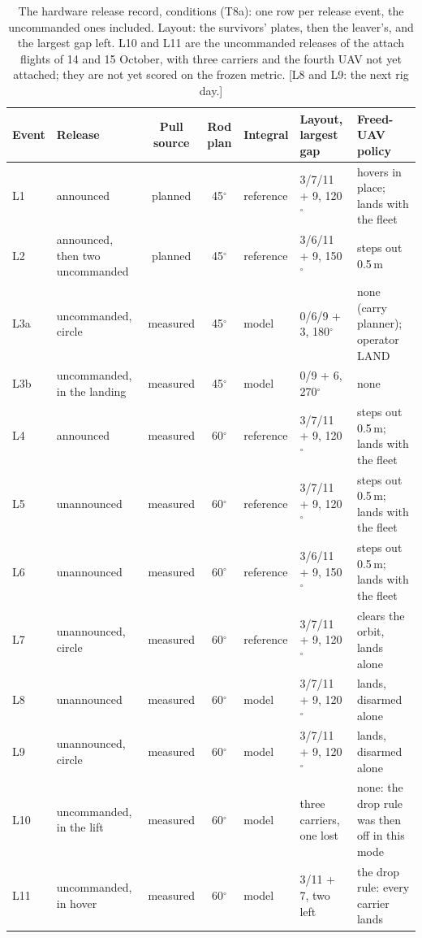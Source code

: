 \begin{table}[htbp]
  \centering
  \footnotesize
  \caption[The rig release record: conditions]{The hardware release record, conditions (T8a): one row per release
  event, the uncommanded ones included. Layout: the survivors' plates, then the leaver's, and the largest gap left.
  L10 and L11 are the uncommanded releases of the attach flights of 14 and 15 October, with three carriers and the
  fourth UAV not yet attached; they are not yet scored on the frozen metric. [L8 and L9: the next rig day.]}
  \label{tab:T8a}
  \begin{tabularx}{\textwidth}{lYccYYY}
    \toprule
    Event & Release & Pull source & Rod plan & Integral & Layout, largest gap & Freed-UAV policy \\
    \midrule
    L1 & announced & planned & 45$^\circ$ & reference & 3/7/11 + 9, 120$^\circ$ & hovers in place; lands with the fleet \\ %
    L2 & announced, then two uncommanded & planned & 45$^\circ$ & reference & 3/6/11 + 9, 150$^\circ$ & steps out 0.5\,m \\ %
    L3a & uncommanded, circle & measured & 45$^\circ$ & model & 0/6/9 + 3, 180$^\circ$ & none (carry planner); operator LAND \\ %
    L3b & uncommanded, in the landing & measured & 45$^\circ$ & model & 0/9 + 6, 270$^\circ$ & none \\ %
    L4 & announced & measured & 60$^\circ$ & reference & 3/7/11 + 9, 120$^\circ$ & steps out 0.5\,m; lands with the fleet \\ %
    L5 & unannounced & measured & 60$^\circ$ & reference & 3/7/11 + 9, 120$^\circ$ & steps out 0.5\,m; lands with the fleet \\ %
    L6 & unannounced & measured & 60$^\circ$ & reference & 3/6/11 + 9, 150$^\circ$ & steps out 0.5\,m; lands with the fleet \\ %
    L7 & unannounced, circle & measured & 60$^\circ$ & reference & 3/7/11 + 9, 120$^\circ$ & clears the orbit, lands alone \\ %
    L8 & unannounced & measured & 60$^\circ$ & model & 3/7/11 + 9, 120$^\circ$ & lands, disarmed alone \\
    L9 & unannounced, circle & measured & 60$^\circ$ & model & 3/7/11 + 9, 120$^\circ$ & lands, disarmed alone \\
    L10 & uncommanded, in the lift & measured & 60$^\circ$ & model & three carriers, one lost & none: the drop rule was then off in this mode \\ %
    L11 & uncommanded, in hover & measured & 60$^\circ$ & model & 3/11 + 7, two left & the drop rule: every carrier lands \\ %
    \bottomrule
  \end{tabularx}
\end{table}
